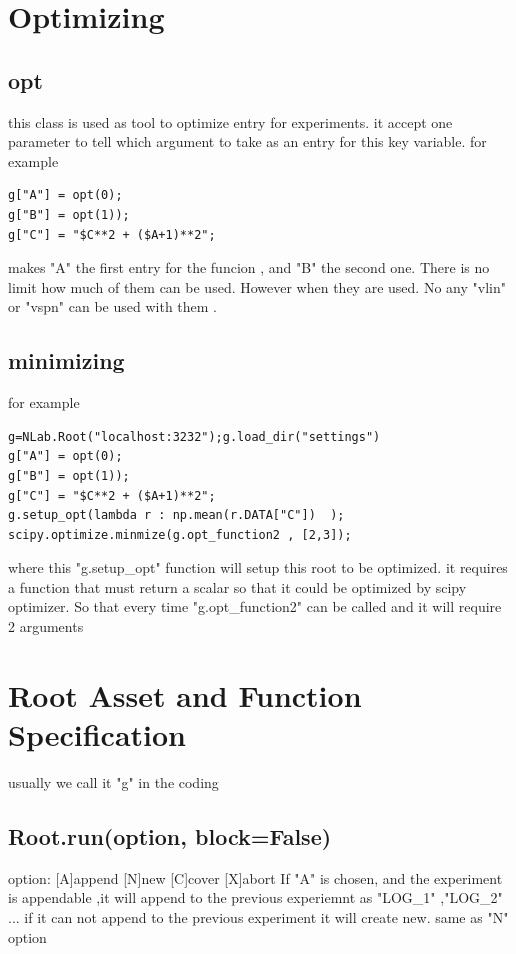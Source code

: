 \documentclass{article}
\begin{document}
\section{Optimizing}
\subsection{opt}
this class is used as tool to optimize entry for experiments.
it accept one parameter to tell which argument to 
take as an entry for this key variable.
for example
\begin{lstlisting}
g["A"] = opt(0);
g["B"] = opt(1));
g["C"] = "$C**2 + ($A+1)**2";
\end{lstlisting}
makes "A" the first entry for the funcion , and "B" the second one.
There is no limit how much of them can be used.
However when they are used. No any "vlin" or "vspn" 
can be used with them .

\subsection{minimizing}
for example
\begin{lstlisting}
g=NLab.Root("localhost:3232");g.load_dir("settings")
g["A"] = opt(0);
g["B"] = opt(1));
g["C"] = "$C**2 + ($A+1)**2";
g.setup_opt(lambda r : np.mean(r.DATA["C"])  );
scipy.optimize.minmize(g.opt_function2 , [2,3]);
\end{lstlisting}

where this "g.setup\_opt" function will setup this root to be optimized.
it requires a function that must return a scalar so that it could be optimized by scipy optimizer.
So that every time "g.opt\_function2" can be called
and it will require 2 arguments







\section{Root Asset and Function Specification}
usually we call it "g" in the coding

\subsection{Root.run(option, block=False)}
 option: [A]append [N]new  [C]cover [X]abort
 If "A" is chosen, and 
 the experiment is appendable ,it will append to the previous experiemnt as "LOG\_1" ,"LOG\_2" ...
 if it can not append to the previous experiment it will create new.
 same as "N" option
\end{document}

